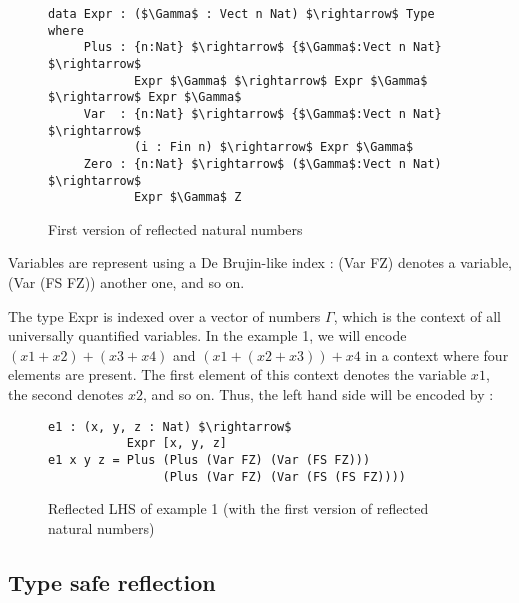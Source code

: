 \begin{figure}[H]
\figrule
\begin{center}
\begin{lstlisting}
data Expr : ($\Gamma$ : Vect n Nat) $\rightarrow$ Type where
     Plus : {n:Nat} $\rightarrow$ {$\Gamma$:Vect n Nat} $\rightarrow$ 
            Expr $\Gamma$ $\rightarrow$ Expr $\Gamma$ $\rightarrow$ Expr $\Gamma$
     Var  : {n:Nat} $\rightarrow$ {$\Gamma$:Vect n Nat} $\rightarrow$ 
            (i : Fin n) $\rightarrow$ Expr $\Gamma$
     Zero : {n:Nat} $\rightarrow$ ($\Gamma$:Vect n Nat) $\rightarrow$ 
            Expr $\Gamma$ Z
\end{lstlisting}
\end{center}
\caption{First version of reflected natural numbers}
\figrule
\end{figure}


Variables are represent using a De Brujin-like index : (Var FZ) denotes a variable, (Var (FS FZ)) another one, and so on.

The type Expr is indexed over a vector of numbers $\Gamma$, which is the context of all universally quantified variables. In the example 1, we will encode $(x1 + x2) + (x3 + x4)$ and $(x1 + (x2 + x3)) + x4$ in a context where four elements are present. The first element of this context denotes the variable $x1$, the second denotes $x2$, and so on.
Thus, the left hand side will be encoded by :

\begin{figure}[H]
\figrule
\begin{center}
\begin{lstlisting}
e1 : (x, y, z : Nat) $\rightarrow$ 
           Expr [x, y, z]
e1 x y z = Plus (Plus (Var FZ) (Var (FS FZ))) 
                (Plus (Var FZ) (Var (FS (FS FZ))))
\end{lstlisting}
\end{center}
\caption{Reflected LHS of example 1 (with the first version of reflected natural numbers)}
\figrule
\end{figure}

\subsection{Type safe reflection}

